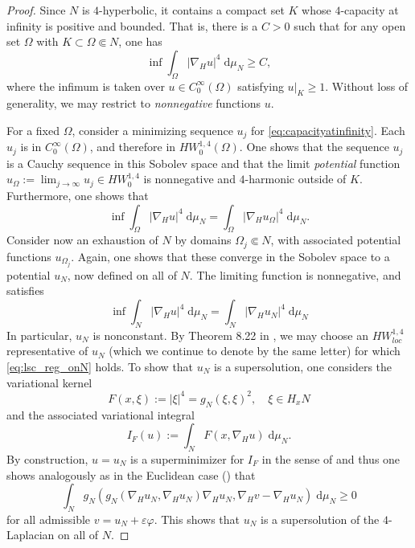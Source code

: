 \documentclass[10pt,letterpaper]{amsart}
\theoremstyle{definition}
\numberwithin{thm}{subsection}
\numberwithin{equation}{section}
\begin{document}
\begin{proof}
Since $N$ is $4$-hyperbolic, it contains a compact set $K$ whose
$4$-capacity at infinity is positive and bounded. That is, there
is a $C>0$ such that for any open set $\Omega$ with $K\subset
\Omega \Subset N$, one has
\begin{equation}\label{eq:capacityatinfinity}
\inf \int_{\Omega} {\left\vert {\nabla_H u} \right \vert}^4 \;\mathrm{d}\mu_N\ge C,
\end{equation}
where the infimum is taken over $u\in C^\infty_0(\Omega)$
satisfying $u\vert_K\geq 1$. Without loss of generality, we may
restrict to \emph{nonnegative} functions $u$.

For a fixed $\Omega$, consider a minimizing sequence $u_j$ for
\eqref{eq:capacityatinfinity}. Each $u_j$ is in
$C_0^\infty(\Omega)$, and therefore in $HW^{1,4}_0(\Omega)$. One
shows that the sequence $u_j$ is a Cauchy sequence in this Sobolev
space and that the limit \emph{potential} function
$u_\Omega:=\lim_{j\rightarrow \infty} u_j \in HW^{1,4}_0$ is
nonnegative and $4$-harmonic outside of $K$. Furthermore, one
shows that
\begin{equation}
\inf \int_{\Omega} {\left\vert {\nabla_H u} \right \vert}^4\;\mathrm{d}\mu_N=
\int_{\Omega} {\left\vert {\nabla_H u_\Omega} \right \vert}^4\;\mathrm{d}\mu_N.
\end{equation}
Consider now an exhaustion of $N$ by domains $\Omega_j \Subset N$,
with associated potential functions $u_{\Omega_j}$. Again, one
shows that these converge
in the Sobolev space to a potential
$u_N$, now defined on all of $N$.  The limiting function is
nonnegative, and satisfies
\begin{equation}\inf \int_{N} {\left\vert {\nabla_H u} \right \vert}^4\;\mathrm{d}\mu_N= \int_{N} {\left\vert {\nabla_H u_N} \right \vert}^4\;\mathrm{d}\mu_N\end{equation}
In particular, $u_N$ is nonconstant. By Theorem 8.22 in
\cite{MR2867756}, we may choose an $HW_{loc}^{1,4}$ representative
of $u_N$ (which we continue to denote by the same letter) for
which \eqref{eq:lsc_reg_onN} holds. To show that $u_N$ is a
supersolution, one considers the variational kernel
\begin{displaymath}
F(x,\xi):= |\xi|^4 = g_N(\xi,\xi)^2,\quad \xi\in H_x N
\end{displaymath}
and the associated variational integral
\begin{displaymath}
I_F(u):= \int_N F(x,\nabla_H u)\;\mathrm{d}\mu_N.
\end{displaymath}
By construction, $u=u_N$ is a superminimizer for $I_F$ in the
sense of \cite[Definition 7.7]{MR2867756} and thus one shows
analogously as in the Euclidean case (\cite[Theorem
5.13]{MR1207810}) that
\begin{displaymath}
\int_N g_N\left(g_N(\nabla_H u_N,\nabla_H u_N)\nabla_H u_N,
\nabla_H v -\nabla_H u_N\right)\;\mathrm{d}\mu_N \geq 0
\end{displaymath}
for all admissible $v=u_N + \varepsilon \varphi$. This shows that
$u_N$ is a supersolution of the $4$-Laplacian on all of $N$.


\end{proof}
\end{document}
